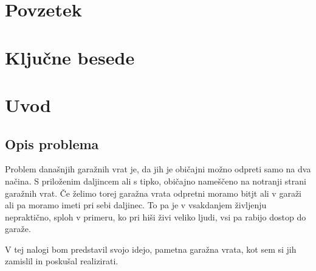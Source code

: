 \documentclass[11pt]{article}
\begin{document}
\newpage
\thispagestyle{empty}
\section*{Povzetek}

\section*{Ključne besede}

\renewcommand{\baselinestretch}{0.90}\normalsize
\newpage
{}
\thispagestyle{empty}
\tableofcontents
\listoftables
\listoffigures
\renewcommand{\baselinestretch}{1.0}\normalsize
\newpage

\pagestyle{fancy}
\fancyhead{}
\fancyfoot{}
\fancyfoot[C]{\thepage}

\setcounter{page}{4}
\section{Uvod}
\subsection{Opis problema}
Problem današnjih garažnih vrat je, da jih je običajni možno odpreti samo na dva načina. S priloženim daljincem ali s tipko, običajno nameščeno na notranji strani garažnih vrat. Če želimo torej garažna vrata odpretni moramo bitjt ali v garaži ali pa moramo imeti pri sebi daljinec. To pa je v vsakdanjem življenju nepraktično, sploh v primeru, ko pri hiši živi veliko ljudi, vsi pa rabijo dostop do garaže.

V tej nalogi bom predstavil svojo idejo, pametna garažna vrata, kot sem si jih zamislil in poskušal realizirati.
\end{document}
